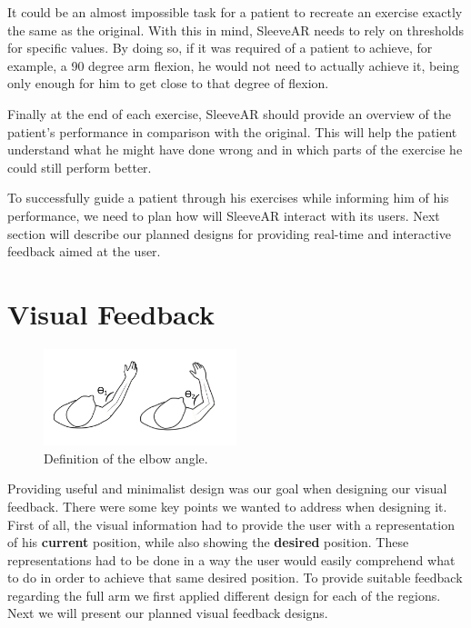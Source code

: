 It could be an almost impossible task for a patient to recreate an exercise exactly the same as the original. 
With this in mind, SleeveAR needs to rely on thresholds for specific values. 
By doing so, if it was required of a patient to achieve, for example, a 90 degree arm flexion, he would not 
need to actually achieve it, being only enough for him to get close to that degree of flexion.

Finally at the end of each exercise, SleeveAR should provide an overview of the patient's performance in comparison with the original. 
This will help the patient understand what he might have done wrong and in which parts of the exercise he could still perform better.

To successfully guide a patient through his exercises while informing him of his performance, we need to plan how will SleeveAR interact with its users. 
Next section will describe our planned designs for providing real-time and interactive feedback aimed at the user.

\section{Visual Feedback}
\label{vision-feedback}

\begin{figure}[!t]
    \begin{center}
        \includegraphics[width=0.5\textwidth]{imgs/elbowangle.png}
    \end{center}
    \caption{Definition of the elbow angle.}
    \label{fig:elbowangle}
\end{figure}

Providing useful and minimalist design was our goal when designing our visual feedback. There were some key points we wanted to address when designing it.
First of all, the visual information had to provide the user with a representation of his \textbf{current} position, while also showing the \textbf{desired} position. 
These representations had to be done in a way the user would easily comprehend what to do in order to achieve that same desired position.
To provide suitable feedback regarding the full arm we first applied different design for each of the regions. Next we will present our planned visual feedback designs.

